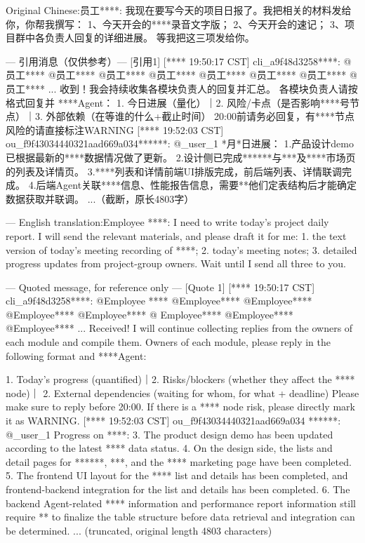 \documentclass{llmxive}
\begin{document}
\begin{casebox}\scriptsize
\begin{caselines}
Original Chinese:\nopagebreak[4]
员工****: 我现在要写今天的项目日报了。我把相关的材料发给你，你帮我撰写：
1、今天开会的****录音文字版；
2、今天开会的速记；
3、项目群中各负责人回复的详细进展。
等我把这三项发给你。

--- 引用消息（仅供参考）---
[引用1]
[**** 19:50:17 CST] cli\_a9f48d3258****: @员工**** @员工**** @员工**** @员工**** @员工**** @员工**** @员工**** @员工**** ...
收到！我会持续收集各模块负责人的回复并汇总。
各模块负责人请按格式回复并 ****Agent：
1. 今日进展（量化）｜2. 风险/卡点（是否影响****号节点）｜3. 外部依赖（在等谁的什么+截止时间）
20:00前请务必回复，有****节点风险的请直接标注WARNING
[**** 19:52:03 CST] ou\_f9f43034440321aad669a034******: @\_user\_1
*月*日进展：
1.产品设计demo已根据最新的****数据情况做了更新。
2.设计侧已完成******与***及****市场页的列表及详情页。
3.****列表和详情前端UI排版完成，前后端列表、详情联调完成。
4.后端Agent关联****信息、性能报告信息，需要**他们定表结构后才能确定数据获取并联调。
...（截断，原长4803字）

---
English translation:\nopagebreak[4]
Employee ****: I need to write today's project daily report. I will send the relevant materials, and please draft it for me:
1. the text version of today's meeting recording of ****;
2. today's meeting notes;
3. detailed progress updates from project-group owners.
Wait until I send all three to you.

--- Quoted message, for reference only --- 
[Quote 1] 
[**** 19:50:17 CST] cli\_a9f48d3258****: @Employee 
**** @Employee**** @Employee**** @Employee**** @Employee**** @ 
Employee**** @Employee**** @Employee**** ... 
Received! I will continue collecting replies from the owners of each module and compile them. 
Owners of each module, please reply in the following format and ****Agent: 

1. Today's progress (quantified)｜2. Risks/blockers (whether they affect the **** node)｜
2. External dependencies (waiting for whom, for what + deadline)
   Please make sure to reply before 20:00. If there is a **** node risk, please directly mark it as WARNING.
   [**** 19:52:03 CST] ou\_f9f43034440321aad669a034
   ******: @\_user\_1
   Progress on ****:
3. The product design demo has been updated according to the latest **** data status.
4. On the design side, the lists and detail pages for ******, ***, and the **** marketing page have been completed.
5. The frontend UI layout for the **** list and details has been completed, and frontend-backend integration for the list and details has been completed.
6. The backend Agent-related **** information and performance report information still require ** to finalize the table structure before data retrieval and integration can be determined.
   ... (truncated, original length 4803 characters)

\end{caselines}
\end{casebox}
\end{document}
